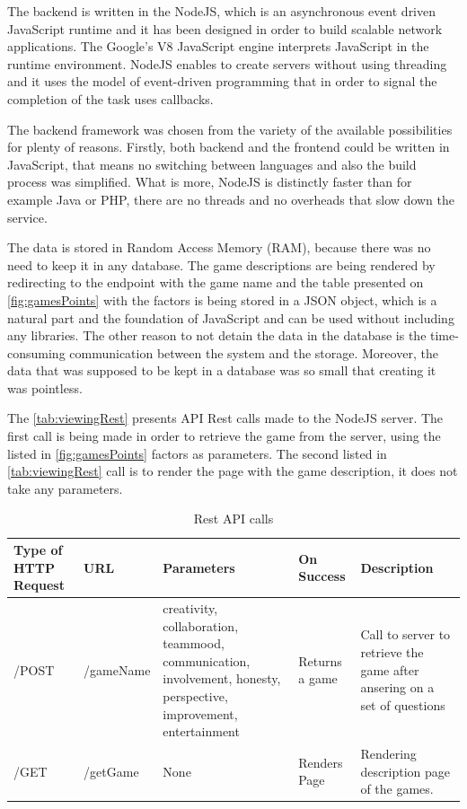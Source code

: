 The backend is written in the NodeJS, which is an asynchronous event driven JavaScript runtime and it has been designed in order to build scalable network applications. The Google's V8 JavaScript engine interprets JavaScript in the runtime environment. NodeJS enables to create servers without using threading and it uses the model of event-driven programming that in order to signal the completion of the task uses callbacks.

The backend framework was chosen from the variety of the available possibilities for plenty of reasons. Firstly, both backend and the frontend could be written in JavaScript, that means no switching between languages and also the build process was simplified. What is more, NodeJS is distinctly faster than for example Java or PHP, there are no threads and no overheads that slow down the service.

The data is stored in Random Access Memory (RAM), because there was no need to keep it in any database. The game descriptions are being rendered by redirecting to the endpoint with the game name and the table presented on \autoref{fig:gamesPoints} with the factors is being stored in a JSON object, which is a natural part and the foundation of JavaScript and can be used without including any libraries. The other reason to not detain the data in the database is the time-consuming communication between the system and the storage. Moreover, the data that was supposed to be kept in a database was so small that creating it was pointless.

The \autoref{tab:viewingRest} presents API Rest calls made to the NodeJS server. The first call is being made in order to retrieve the game from the server, using the listed in \autoref{fig:gamesPoints} factors as parameters. The second listed in \autoref{tab:viewingRest} call is to render the page with the game description, it does not take any parameters.

\begin{table}[h]
	\caption{Rest API calls}
	\label{tab:viewingRest}
	\begin{tabularx}{\textwidth}{|X|X|X|X|X|}
	\hline
		Type of HTTP Request & URL & Parameters & On Success & Description \\ \hline
		/POST &  /{gameName} & creativity, collaboration, teammood, communication, involvement, honesty, perspective, improvement, entertainment & Returns a game & Call to server to retrieve the game after ansering on a set of questions \\ \hline
		/GET & /getGame & None & Renders Page & Rendering description page of the games. \\ \hline
	\end{tabularx}
\end{table}

